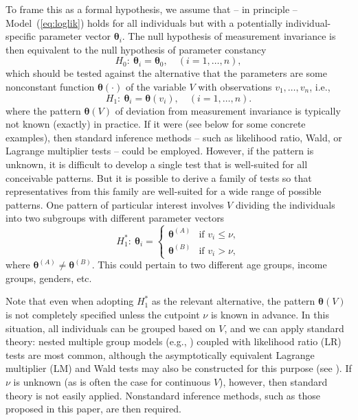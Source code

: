 \documentclass[man]{apa}
\begin{document}
To frame this as a formal hypothesis, we assume that -- in principle --
Model~(\ref{eq:loglik}) holds for all individuals but with a
potentially individual-specific 
parameter vector ${\bm \theta}_i$. The null hypothesis of measurement invariance
is then equivalent to the null hypothesis of parameter constancy
\begin{equation}
    \label{eq:h0}
    H_0:~ {\bm \theta}_i = {\bm \theta}_0,\quad (i=1,\ldots,n),
\end{equation}
which should be tested against the alternative that the parameters
are some nonconstant function ${\bm \theta}(\cdot)$ of the variable $V$ with observations
$v_1, \dots, v_n$, i.e.,
\begin{equation}
    \label{eq:h1}
    H_1:~ {\bm \theta}_i = {\bm \theta}(v_i),\quad (i=1,\ldots,n).
\end{equation}
where the pattern ${\bm \theta}(V)$ of deviation from measurement invariance is
typically not known (exactly) in practice. If it were (see below for
some concrete examples), then standard inference methods -- such as likelihood
ratio, Wald, or Lagrange multiplier tests -- could be employed. However,
if the pattern is unknown, it is difficult to develop a single test
that is well-suited for all conceivable patterns. But it is possible to
derive a family of tests so that representatives from this family are well-suited
for a wide range of possible patterns. One pattern of particular interest
involves $V$ dividing the individuals into two subgroups with different
parameter vectors
\begin{equation}
  \label{eq:h1*}
  H_1^*:~ {\bm \theta}_i = \left\{ \begin{array}{ll}
    {\bm \theta}^{(A)} & \mbox{if } v_i \le \nu, \\
    {\bm \theta}^{(B)} & \mbox{if } v_i >   \nu,
  \end{array} \right.
\end{equation}
where ${\bm \theta}^{(A)} \neq {\bm \theta}^{(B)}$. This could pertain to 
two different age groups, income groups, genders, etc.

Note that even when adopting $H_1^*$ as the relevant alternative, the pattern
${\bm \theta}(V)$ is not completely specified unless the cutpoint $\nu$ is known
in advance.  In this situation, all individuals can be grouped based on $V$, and
we can apply standard theory: nested multiple group models (e.g.,
) coupled with likelihood ratio (LR) tests are most common,
although the asymptotically equivalent  Lagrange multiplier
(LM) and Wald tests may also be constructed for this purpose (see
). If $\nu$
is unknown (as is often the case for continuous $V$), however, then
standard theory 
is not easily applied.   Nonstandard inference methods, such as those
proposed in this paper, are then required.
\end{document}
